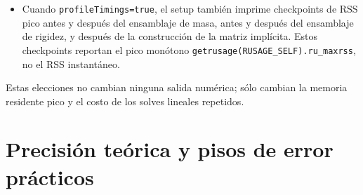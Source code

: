 \documentclass[11pt,a4paper]{article}
\newcommand{\code}[1]{\texttt{\small #1}}
\newcommand{\Aimp}{\mathbf{A}}
\newcommand{\Bimp}{\mathbf{B}}
\begin{document}
\begin{itemize}
\code{M\_ARENA\_MAX} se pone en 2 para evitar que el pool de threads OpenMP del ODE fuerce
docenas de arenas, \code{M\_MMAP\_THRESHOLD} y \code{M\_TRIM\_THRESHOLD} se bajan a 64\,KiB para
que los temporales de Eigen de tamaño medio durante las factorizaciones QR de LRE se coloquen
en regiones \code{mmap} que se devuelven al SO al liberarse. Cuando
\code{memoryOptimizationTrimHeap=true} y el modo de optimización de memoria es efectivo,
\code{malloc\_trim(0)} se llama después del ensamblaje de la matriz de masa, después del
ensamblaje de la matriz de rigidez, y después de construir $\Aimp/\Bimp$; esto libera el
padding del heap dejado por la enorme cantidad de asignaciones pequeñas de Eigen realizadas
durante el setup de LRE.
\item Cuando \code{profileTimings=true}, el setup también imprime checkpoints de RSS pico antes
y después del ensamblaje de masa, antes y después del ensamblaje de rigidez, y después de la
construcción de la matriz implícita. Estos checkpoints reportan el pico monótono
\code{getrusage(RUSAGE\_SELF).ru\_maxrss}, no el RSS instantáneo.
\end{itemize}
Estas elecciones no cambian ninguna salida numérica; sólo cambian la memoria residente pico y
el costo de los solves lineales repetidos.

\section{Precisión teórica y pisos de error prácticos}
\end{document}
